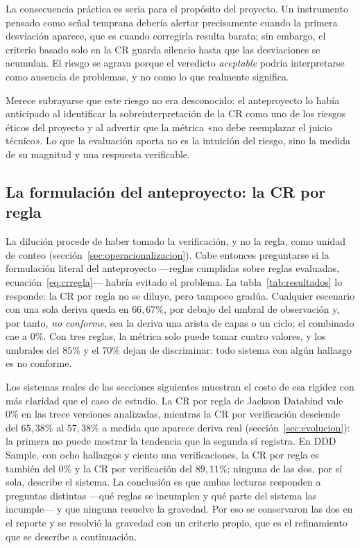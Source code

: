 La consecuencia práctica es seria para el propósito del proyecto. Un instrumento pensado como señal temprana debería alertar precisamente cuando la primera desviación aparece, que es cuando corregirla resulta barata; sin embargo, el criterio basado solo en la CR guarda silencio hasta que las desviaciones se acumulan. El riesgo se agrava porque el veredicto \textit{aceptable} podría interpretarse como ausencia de problemas, y no como lo que realmente significa.

Merece subrayarse que este riesgo no era desconocido: el anteproyecto lo había anticipado al identificar la sobreinterpretación de la CR como uno de los riesgos éticos del proyecto y al advertir que la métrica «no debe reemplazar el juicio técnico». Lo que la evaluación aporta no es la intuición del riesgo, sino la medida de su magnitud y una respuesta verificable.

\subsection{La formulación del anteproyecto: la CR por regla}
\label{sec:crregla}
La dilución procede de haber tomado la verificación, y no la regla, como unidad de conteo (sección~\ref{sec:operacionalizacion}). Cabe entonces preguntarse si la formulación literal del anteproyecto ---reglas cumplidas sobre reglas evaluadas, ecuación~\ref{eq:crregla}--- habría evitado el problema. La tabla~\ref{tab:resultados} lo responde: la CR por regla no se diluye, pero tampoco gradúa. Cualquier escenario con una sola deriva queda en $66{,}67\%$, por debajo del umbral de observación y, por tanto, \textit{no conforme}, sea la deriva una arista de capas o un ciclo; el combinado cae a $0\%$. Con tres reglas, la métrica solo puede tomar cuatro valores, y los umbrales del $85\%$ y el $70\%$ dejan de discriminar: todo sistema con algún hallazgo es no conforme.

Los sistemas reales de las secciones siguientes muestran el costo de esa rigidez con más claridad que el caso de estudio. La CR por regla de Jackson Databind vale $0\%$ en las trece versiones analizadas, mientras la CR por verificación desciende del $65{,}38\%$ al $57{,}38\%$ a medida que aparece deriva real (sección~\ref{sec:evolucion}): la primera no puede mostrar la tendencia que la segunda sí registra. En DDD Sample, con ocho hallazgos y ciento una verificaciones, la CR por regla es también del $0\%$ y la CR por verificación del $89{,}11\%$; ninguna de las dos, por sí sola, describe el sistema. La conclusión es que ambas lecturas responden a preguntas distintas ---qué reglas se incumplen y qué parte del sistema las incumple--- y que ninguna resuelve la gravedad. Por eso se conservaron las dos en el reporte y se resolvió la gravedad con un criterio propio, que es el refinamiento que se describe a continuación.

